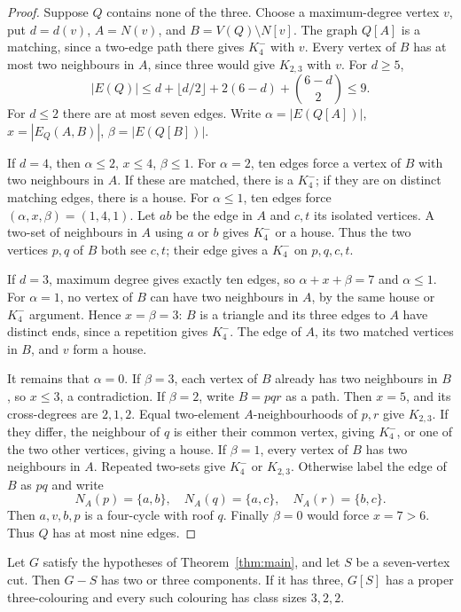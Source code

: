 \begin{proof}
Suppose $Q$ contains none of the three.  Choose a maximum-degree vertex
$v$, put $d=d(v)$, $A=N(v)$, and $B=V(Q)\setminus N[v]$.
The graph $Q[A]$ is a matching, since a two-edge path there gives
$K_4^{-}$ with $v$.  Every vertex of $B$ has at most two neighbours in
$A$, since three would give $K_{2,3}$ with $v$.  For $d\geq5$,
\[
 |E(Q)|\leq d+\lfloor d/2\rfloor+2(6-d)+\binom{6-d}{2}\leq9.
\]
For $d\leq2$ there are at most seven edges.  Write
$\alpha=|E(Q[A])|$, $x=|E_Q(A,B)|$, $\beta=|E(Q[B])|$.

If $d=4$, then $\alpha\leq2$, $x\leq4$, $\beta\leq1$.
For $\alpha=2$, ten edges force a vertex of $B$ with two neighbours in
$A$.  If these are matched, there is a $K_4^{-}$; if they are on distinct
matching edges, there is a house.  For $\alpha\leq1$, ten edges force
$(\alpha,x,\beta)=(1,4,1)$.  Let $ab$ be the edge in $A$ and $c,t$ its
isolated vertices.  A two-set of neighbours in $A$ using $a$ or $b$
gives $K_4^{-}$ or a house.  Thus the two vertices $p,q$ of $B$ both see
$c,t$; their edge gives a $K_4^{-}$ on $p,q,c,t$.

If $d=3$, maximum degree gives exactly ten edges, so
$\alpha+x+\beta=7$ and $\alpha\leq1$.  For $\alpha=1$, no vertex of
$B$ can have two neighbours in $A$, by the same house or $K_4^{-}$
argument.  Hence $x=\beta=3$: $B$ is a triangle and its three edges to
$A$ have distinct ends, since a repetition gives $K_4^{-}$.  The edge
of $A$, its two matched vertices in $B$, and $v$ form a house.

It remains that $\alpha=0$.  If $\beta=3$, each vertex of $B$ already has two neighbours in $B$,
so $x\leq3$, a contradiction.  If $\beta=2$, write $B=pqr$ as a path.
Then $x=5$, and its cross-degrees are $2,1,2$.  Equal two-element
$A$-neighbourhoods of $p,r$ give $K_{2,3}$.  If they differ, the neighbour
of $q$ is either their common vertex, giving $K_4^{-}$, or one of the
two other vertices, giving a house.  If $\beta=1$, every vertex of $B$
has two neighbours in $A$.  Repeated two-sets give $K_4^{-}$ or
$K_{2,3}$.  Otherwise label the edge of $B$ as $pq$ and write
\[
 N_A(p)=\{a,b\},\quad N_A(q)=\{a,c\},\quad N_A(r)=\{b,c\}.
\]
Then $a,v,b,p$ is a four-cycle with roof $q$.  Finally $\beta=0$ would
force $x=7>6$.  Thus $Q$ has at most nine edges.
\end{proof}

\begin{lemma}\label{lem:three-cut-boundary}
Let $G$ satisfy the hypotheses of Theorem~\ref{thm:main}, and let $S$
be a seven-vertex cut.
Then $G-S$ has two or three components.  If it has three, $G[S]$ has a
proper three-colouring and every such colouring has class sizes $3,2,2$.
\end{lemma}

